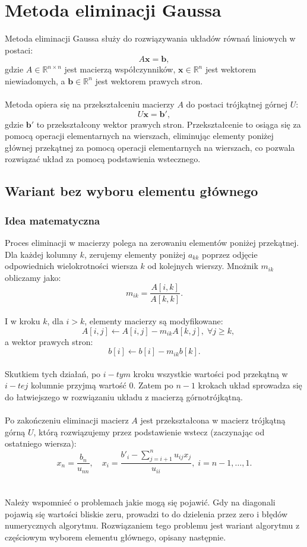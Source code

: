 \documentclass{article}
\begin{document}
    
\section{Metoda eliminacji Gaussa}
Metoda eliminacji Gaussa służy do rozwiązywania układów równań liniowych w postaci:
\[
A \mathbf{x} = \mathbf{b},
\]
gdzie $A \in \mathbb{R}^{n \times n}$ jest macierzą współczynników, $\mathbf{x} \in \mathbb{R}^n$ jest wektorem niewiadomych, a $\mathbf{b} \in \mathbb{R}^n$ jest wektorem prawych stron.
\\ \\
Metoda opiera się na przekształceniu macierzy $A$ do postaci trójkątnej górnej $U$:
\[
U \mathbf{x} = \mathbf{b}',
\]
gdzie $\mathbf{b}'$ to przekształcony wektor prawych stron. Przekształcenie to osiąga się za pomocą operacji elementarnych na wierszach, eliminując elementy poniżej głównej przekątnej za pomocą operacji elementarnych na wierszach, co pozwala rozwiązać układ za pomocą podstawienia wstecznego.
\subsection{Wariant bez wyboru elementu głównego}
\subsubsection{Idea matematyczna}
Proces eliminacji w macierzy polega na zerowaniu elementów poniżej przekątnej. 
Dla każdej kolumny \( k \), zerujemy elementy poniżej \( a_{kk} \) poprzez odjęcie odpowiednich wielokrotności wiersza \( k \) od kolejnych wierszy. 
Mnożnik \( m_{ik} \) obliczamy jako:
\[
m_{ik} = \frac{A[i, k]}{A[k, k]}.
\]
\\
I w kroku $k$, dla $i > k$, elementy macierzy są modyfikowane:
\[\quad A[i, j] \gets A[i, j] - m_{ik} A[k, j], \; \forall j \geq k,
\]
a wektor prawych stron:
\[
b[i] \gets b[i] - m_{ik} b[k].
\]
\\ 
Skutkiem tych działań, po $i-tym$ kroku wszystkie wartości pod przekątną w $i-tej$ kolumnie przyjmą wartość $0$. Zatem po $n-1$ krokach układ sprowadza się do łatwiejszego w rozwiązaniu układu z macierzą górnotrójkątną.
\\\\
Po zakończeniu eliminacji macierz $A$ jest przekształcona w macierz trójkątną górną $U$, którą rozwiązujemy przez podstawienie wstecz (zaczynając od ostatniego wiersza):
\[
x_n = \frac{b_n}{u_{nn}}, \quad x_i = \frac{b'_i - \sum_{j=i+1}^n u_{ij} x_j}{u_{ii}}, \; i = n-1, \dots, 1.
\]
\\ \\ Należy wspomnieć o problemach jakie mogą się pojawić. Gdy na diagonali pojawią się wartości bliskie zeru, prowadzi to do dzielenia przez zero i błędów numerycznych algorytmu. Rozwiązaniem tego problemu jest wariant algorytmu z częściowym wyborem elementu głównego, opisany następnie.
\end{document}

